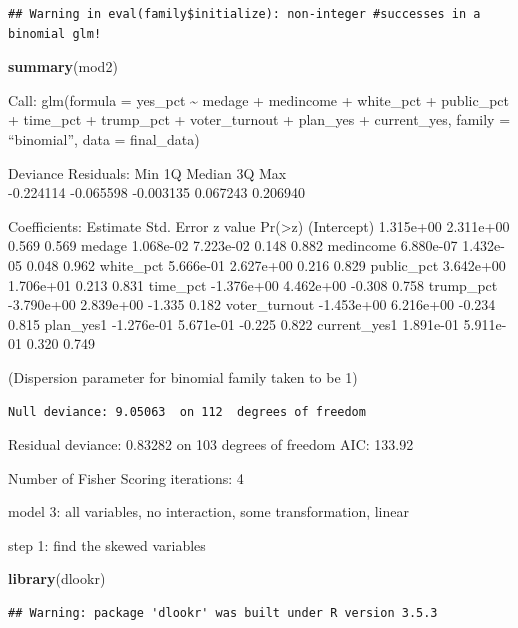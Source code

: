 \documentclass[
]{article}
\newenvironment{Shaded}{\begin{snugshade}}{\end{snugshade}}
\newcommand{\KeywordTok}[1]{\textcolor[rgb]{0.13,0.29,0.53}{\textbf{#1}}}
\newcommand{\NormalTok}[1]{#1}
\begin{document}
\begin{verbatim}
## Warning in eval(family$initialize): non-integer #successes in a binomial glm!
\end{verbatim}

\begin{Shaded}
\begin{Highlighting}[]
\KeywordTok{summary}\NormalTok{(mod2)}
\end{Highlighting}
\end{Shaded}

Call: glm(formula = yes\_pct \textasciitilde{} medage + medincome +
white\_pct + public\_pct + time\_pct + trump\_pct + voter\_turnout +
plan\_yes + current\_yes, family = ``binomial'', data = final\_data)

Deviance Residuals: Min 1Q Median 3Q Max\\
-0.224114 -0.065598 -0.003135 0.067243 0.206940

Coefficients: Estimate Std. Error z value
Pr(\textgreater\textbar z\textbar) (Intercept) 1.315e+00 2.311e+00 0.569
0.569 medage 1.068e-02 7.223e-02 0.148 0.882 medincome 6.880e-07
1.432e-05 0.048 0.962 white\_pct 5.666e-01 2.627e+00 0.216 0.829
public\_pct 3.642e+00 1.706e+01 0.213 0.831 time\_pct -1.376e+00
4.462e+00 -0.308 0.758 trump\_pct -3.790e+00 2.839e+00 -1.335 0.182
voter\_turnout -1.453e+00 6.216e+00 -0.234 0.815 plan\_yes1 -1.276e-01
5.671e-01 -0.225 0.822 current\_yes1 1.891e-01 5.911e-01 0.320 0.749

(Dispersion parameter for binomial family taken to be 1)

\begin{verbatim}
Null deviance: 9.05063  on 112  degrees of freedom
\end{verbatim}

Residual deviance: 0.83282 on 103 degrees of freedom AIC: 133.92

Number of Fisher Scoring iterations: 4

model 3: all variables, no interaction, some transformation, linear

step 1: find the skewed variables

\begin{Shaded}
\begin{Highlighting}[]
\KeywordTok{library}\NormalTok{(dlookr)}
\end{Highlighting}
\end{Shaded}

\begin{verbatim}
## Warning: package 'dlookr' was built under R version 3.5.3
\end{verbatim}
\end{document}
